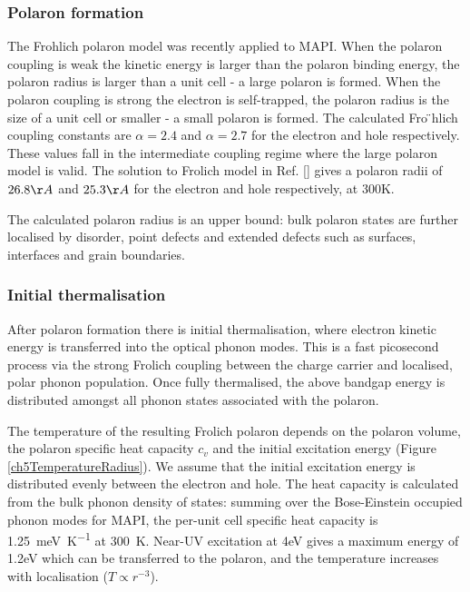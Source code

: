 \subsubsection{Polaron formation}
The Frohlich polaron model was recently applied to MAPI.\cite{} %
When the polaron coupling is weak the kinetic energy is larger than the polaron binding energy, the polaron radius is larger than a unit cell - a large polaron is formed. When the polaron coupling is strong the electron is self-trapped, the polaron radius is the size of a unit cell or smaller - a small polaron is formed. The calculated Fro ̈hlich coupling constants are $\alpha=2.4$ and $\alpha=2.7$ for the electron and hole respectively. These values fall in the intermediate coupling regime where the large polaron model is valid.  The solution to Frolich model in Ref. [] gives a polaron radii of $26.8\AA$ and $25.3\AA$ for the electron and hole respectively, at 300K.

The calculated polaron radius is an upper bound: bulk polaron states are further localised by disorder, point defects and extended defects such as surfaces, interfaces and grain boundaries.


\subsubsection{Initial thermalisation}
After polaron formation there is initial thermalisation, where electron kinetic energy is transferred into the optical phonon modes. This is a fast picosecond process via the strong Frolich coupling between the charge carrier and localised, polar phonon population.
Once fully thermalised, the above bandgap energy is distributed amongst all phonon states associated with the polaron.

The temperature of the resulting Fr{\:o}lich polaron depends on the polaron volume, the polaron specific heat capacity $c_v$ and the initial excitation energy (Figure \ref{ch5TemperatureRadius}). We assume that the initial excitation energy is distributed evenly between the electron and hole. The heat capacity is calculated from the bulk phonon density of states: summing over the Bose-Einstein occupied phonon modes for MAPI, the per-unit cell specific heat capacity is \SI{1.25}{\milli\eV\per\K} at
\SI{300}{\K}. Near-UV excitation at 4eV gives a maximum energy of 1.2eV which can be transferred to the polaron, and the temperature increases with localisation ($T \propto r^{-3}$).

